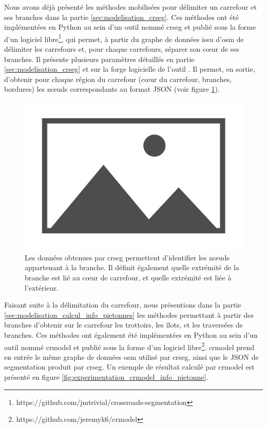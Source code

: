 \newpar{}

Nous avons déjà présenté les méthodes mobilisées pour délimiter un carrefour et ses branches dans la partie \ref{sec:modelisation_crseg}. Ces méthodes ont été implémentées en Python au sein d'un outil nommé crseg et publié sous la forme d'un logiciel libre\footnote{https://github.com/jmtrivial/crossroads-segmentation}, qui permet, à partir du graphe de données issu d'\gls{osm} de délimiter les carrefours et, pour chaque carrefours, séparer son cœur de ses branches. Il présente plusieurs paramètres détaillés en partie \ref{sec:modelisation_crseg} et sur la forge logicielle de l'outil . Il permet, en sortie, d'obtenir pour chaque région du carrefour (cœur du carrefour, branches, bordures) les nœuds correspondants au format JSON (voir figure \ref{fig:experimentation_crseg_json}).

\begin{figure}
    \centering
    \includegraphics{images/placeholder.jpg}
    \caption{Les données obtenues par crseg permettent d'identifier les nœuds appartenant à la branche. Il définit également quelle extrémité de la branche est lié au cœur de carrefour, et quelle extrémité est liée à l'extérieur.}
    \label{fig:experimentation_crseg_json}
\end{figure}

\newpar{}

Faisant suite à la délimitation du carrefour, nous présentions dans la partie \ref{sec:modelisation_calcul_info_pietonnes} les méthodes permettant à partir des branches d'obtenir sur le carrefour les trottoirs, les îlots, et les traversées de branches. Ces méthodes ont également été implémentées en Python au sein d'un outil nommé crmodel et publié sous la forme d'un logiciel libre\footnote{https://github.com/jeremyk6/crmodel}. crmodel prend en entrée le même graphe de données \gls{osm} utilisé par crseg, ainsi que le JSON de segmentation produit par crseg. Un exemple de résultat calculé par crmodel est présenté en figure \ref{fig:experimentation_crmodel_info_pietonne}.


